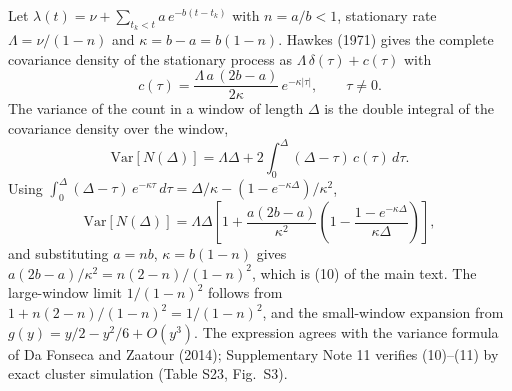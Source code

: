 Let $\lambda(t) = \nu + \sum_{t_{k} < t} a\, e^{-b(t - t_{k})}$ with $n = a/b < 1$, stationary rate $\Lambda = \nu/(1 - n)$ and $\kappa = b - a = b(1 - n)$. Hawkes (1971) gives the complete covariance density of the stationary process as $\Lambda\,\delta(\tau) + c(\tau)$ with
\begin{equation}
c(\tau) = \frac{\Lambda\, a\,(2b - a)}{2\kappa}\, e^{-\kappa|\tau|}, \qquad \tau \neq 0. \tag{S16.1}
\end{equation}
The variance of the count in a window of length $\Delta$ is the double integral of the covariance density over the window,
\begin{equation}
\mathrm{Var}[N(\Delta)] = \Lambda\Delta + 2\int_{0}^{\Delta} (\Delta - \tau)\, c(\tau)\, d\tau. \tag{S16.2}
\end{equation}
Using $\int_{0}^{\Delta} (\Delta - \tau)\, e^{-\kappa\tau}\, d\tau = \Delta/\kappa - (1 - e^{-\kappa\Delta})/\kappa^{2}$,
\begin{equation}
\mathrm{Var}[N(\Delta)] = \Lambda\Delta\left[1 + \frac{a(2b - a)}{\kappa^{2}}\left(1 - \frac{1 - e^{-\kappa\Delta}}{\kappa\Delta}\right)\right], \tag{S16.3}
\end{equation}
and substituting $a = nb$, $\kappa = b(1 - n)$ gives $a(2b - a)/\kappa^{2} = n(2 - n)/(1 - n)^{2}$, which is (10) of the main text. The large-window limit $1/(1 - n)^{2}$ follows from $1 + n(2 - n)/(1 - n)^{2} = 1/(1 - n)^{2}$, and the small-window expansion from $g(y) = y/2 - y^{2}/6 + O(y^{3})$. The expression agrees with the variance formula of Da Fonseca and Zaatour (2014); Supplementary Note 11 verifies (10)--(11) by exact cluster simulation (Table S23, Fig.~S3).



\vspace{10pt}

